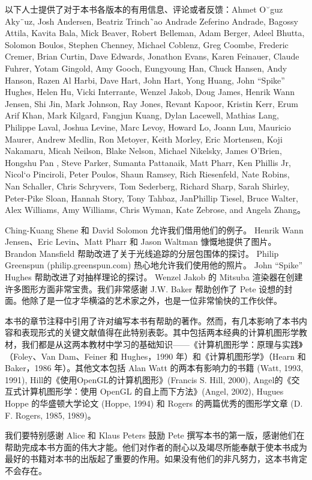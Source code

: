 \documentclass[lang=cn,10pt]{elegantbook}
\begin{document}
以下人士提供了对于本书各版本的有用信息、评论或者反馈：Ahmet O˘guz Aky¨uz, Josh Andersen, Beatriz Trinch˜ao Andrade Zeferino Andrade, Bagossy Attila, Kavita Bala, Mick Beaver, Robert Belleman, Adam Berger, Adeel Bhutta, Solomon Boulos, Stephen Chenney, Michael Coblenz, Greg Coombe, Frederic Cremer, Brian Curtin, Dave Edwards, Jonathon Evans, Karen Feinauer, Claude Fuhrer, Yotam Gingold, Amy Gooch, Eungyoung Han, Chuck Hansen, Andy Hanson, Razen Al Harbi, Dave Hart, John Hart, Yong Huang, John “Spike” Hughes, Helen Hu, Vicki Interrante, Wenzel Jakob, Doug James, Henrik Wann Jensen, Shi Jin, Mark Johnson, Ray Jones, Revant Kapoor, Kristin Kerr, Erum Arif Khan, Mark Kilgard, Fangjun Kuang, Dylan Lacewell, Mathias Lang, Philippe Laval, Joshua Levine, Marc Levoy, Howard Lo, Joann Luu, Mauricio Maurer, Andrew Medlin, Ron Metoyer, Keith Morley, Eric Mortensen, Koji Nakamaru, Micah Neilson, Blake Nelson, Michael Nikelsky, James O’Brien, Hongshu Pan , Steve Parker, Sumanta Pattanaik, Matt Pharr, Ken Phillis Jr, Nicol`o Pinciroli, Peter Poulos, Shaun Ramsey, Rich Riesenfeld, Nate Robins, Nan Schaller, Chris Schryvers, Tom Sederberg, Richard Sharp, Sarah Shirley, Peter-Pike Sloan, Hannah Story, Tony Tahbaz, JanPhillip Tiesel, Bruce Walter, Alex Williams, Amy Williams, Chris Wyman, Kate Zebrose, and Angela Zhang。  

Ching-Kuang Shene 和 David Solomon 允许我们借用他们的例子。 Henrik Wann Jensen、Eric Levin、Matt Pharr 和 Jason Waltman 慷慨地提供了图片。 Brandon Mansfield 帮助改进了关于光线追踪的分层包围体的探讨。 Philip Greenspun (philip.greenspun.com) 热心地允许我们使用他的照片。 John “Spike” Hughes 帮助改进了对抽样理论的探讨。 Wenzel Jakob 的 Mitsuba 渲染器在创建许多图形方面非常宝贵。我们非常感谢 J.W. Baker 帮助创作了 Pete 设想的封面。他除了是一位才华横溢的艺术家之外，也是一位非常愉快的工作伙伴。  

本书的章节注释中引用了许对编写本书有帮助的著作。然而，有几本影响了本书内容和表现形式的关键文献值得在此特别表彰。其中包括两本经典的计算机图形学教材，我们都是从这两本教材中学习的基础知识——《计算机图形学：原理与实践》（Foley、Van Dam、Feiner 和 Hughes，1990 年）和《计算机图形学》（Hearn 和 Baker，1986 年）。其他文本包括 Alan Watt 的两本有影响力的书籍 (Watt, 1993, 1991), Hill的《使用OpenGL的计算机图形》(Francis S. Hill, 2000), Angel的《交互式计算机图形学：使用 OpenGL 的自上而下方法》(Angel, 2002), Hugues Hoppe 的华盛顿大学论文 (Hoppe, 1994) 和 Rogers 的两篇优秀的图形学文章 (D. F. Rogers, 1985, 1989)。  

我们要特别感谢 Alice 和 Klaus Peters 鼓励 Pete 撰写本书的第一版，感谢他们在帮助完成本书方面的伟大才能。他们对作者的耐心以及竭尽所能奉献于使本书成为最好的书籍对本书的出版起了重要的作用。如果没有他们的非凡努力，这本书肯定不会存在。 
\end{document}
